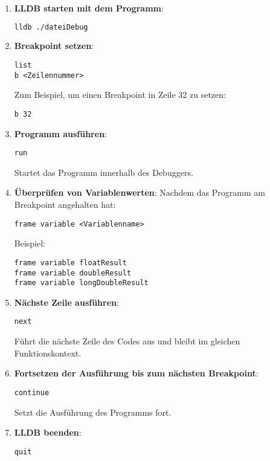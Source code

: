 \documentclass{vorlage-design-main}
\begin{document}
\begin{enumerate}
\def\labelenumi{\arabic{enumi}.}
\item
  \textbf{LLDB starten mit dem Programm}:

\begin{lstlisting}[language=bash]
lldb ./dateiDebug
\end{lstlisting}
\item
  \textbf{Breakpoint setzen}:

\begin{lstlisting}
list
b <Zeilennummer>
\end{lstlisting}

  Zum Beispiel, um einen Breakpoint in Zeile 32 zu setzen:

\begin{lstlisting}
b 32
\end{lstlisting}
\item
  \textbf{Programm ausführen}:

\begin{lstlisting}
run
\end{lstlisting}

  Startet das Programm innerhalb des Debuggers.
\item
  \textbf{Überprüfen von Variablenwerten}: Nachdem das Programm am
  Breakpoint angehalten hat:

\begin{lstlisting}
frame variable <Variablenname>
\end{lstlisting}

  Beispiel:

\begin{lstlisting}
frame variable floatResult
frame variable doubleResult
frame variable longDoubleResult
\end{lstlisting}
\item
  \textbf{Nächste Zeile ausführen}:

\begin{lstlisting}
next
\end{lstlisting}

  Führt die nächste Zeile des Codes aus und bleibt im gleichen
  Funktionskontext.
\item
  \textbf{Fortsetzen der Ausführung bis zum nächsten Breakpoint}:

\begin{lstlisting}
continue
\end{lstlisting}

  Setzt die Ausführung des Programms fort.
\item
  \textbf{LLDB beenden}:

\begin{lstlisting}
quit
\end{lstlisting}
\end{enumerate}
\end{document}
